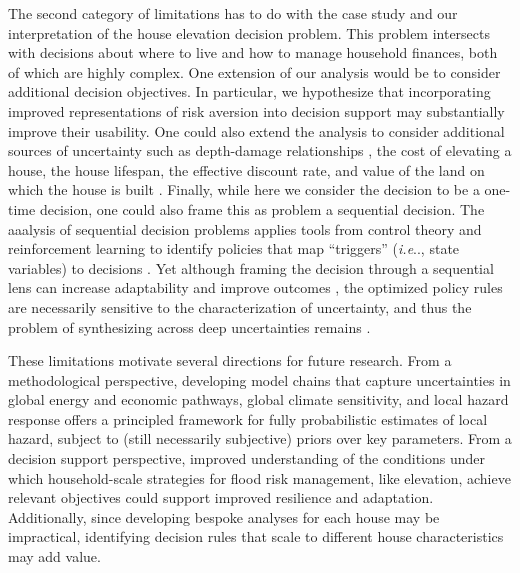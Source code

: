\documentclass[11pt]{article}
\makeatletter
\DeclareRobustCommand\onedot{\futurelet\@let@token\@onedot}
\def\@onedot{\ifx\@let@token.\else.\null\fi\xspace}
\def\ie{\emph{i.e}\onedot} \def\Ie{\emph{I.e}\onedot}
\DeclareRobustCommand\onedot{\futurelet\@let@token\@onedot}
\def\@onedot{\ifx\@let@token.\else.\null\fi\xspace}
\def\ie{\emph{i.e}\onedot} \def\Ie{\emph{I.e}\onedot}
\makeatother
\begin{document}
The second category of limitations has to do with the case study and our interpretation of the house elevation decision problem.
This problem intersects with decisions about where to live and how to manage household finances, both of which are highly complex.
One extension of our analysis would be to consider additional decision objectives.
In particular, we hypothesize that incorporating improved representations of risk aversion into decision support may substantially improve their usability.
One could also extend the analysis to consider additional sources of uncertainty such as depth-damage relationships \citep{Rozer:2019,nofal_fragility:2020}, the cost of elevating a house, the house lifespan, the effective discount rate, and value of the land on which the house is built \citep[provides a framework for addressing some of these]{zarekarizi_suboptimal:2020}.
Finally, while here we consider the decision to be a one-time decision, one could also frame this as problem a sequential decision.
The aaalysis of sequential decision problems applies tools from control theory and reinforcement learning to identify policies that map ``triggers'' (\ie, state variables) to decisions \citep{herman_control:2020}.
Yet although framing the decision through a sequential lens can increase adaptability and improve outcomes \citep{fletcher:2017,garner_slrise:2018}, the optimized policy rules are necessarily sensitive to the characterization of uncertainty, and thus the problem of synthesizing across deep uncertainties remains \citep{herman_control:2020}.

These limitations motivate several directions for future research.
From a methodological perspective, developing model chains that capture uncertainties in global energy and economic pathways, global climate sensitivity, and local hazard response \citep[see fig.~1 of][]{moss_uncertainties:2000} offers a principled framework for fully probabilistic estimates of local hazard, subject to (still necessarily subjective) priors over key parameters.
From a decision support perspective, improved understanding of the conditions under which household-scale strategies for flood risk management, like elevation, achieve relevant objectives could support improved resilience and adaptation.
Additionally, since developing bespoke analyses for each house may be impractical, identifying decision rules that scale to different house characteristics may add value.
\end{document}
